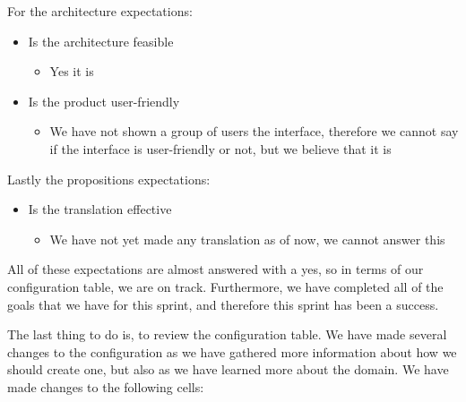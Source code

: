 For the architecture expectations:
\begin{itemize}
    \item Is the architecture feasible
    \begin{itemize}
        \item Yes it is
    \end{itemize}
    \item Is the product user-friendly
    \begin{itemize}
        \item We have not shown a group of users the interface, therefore we cannot say if the interface is user-friendly or not, but we believe that it is
    \end{itemize}
\end{itemize}

Lastly the propositions expectations:
\begin{itemize}
    \item Is the translation effective
    \begin{itemize}
        \item We have not yet made any translation as of now, we cannot answer this
    \end{itemize}
\end{itemize}

All of these expectations are almost answered with a yes, so in terms of our configuration table, we are on track.
Furthermore, we have completed all of the goals that we have for this sprint, and therefore this sprint has been a success.

The last thing to do is, to review the configuration table.
We have made several changes to the configuration as we have gathered more information about how we should create one, but also as we have learned more about the domain.
We have made changes to the following cells:

